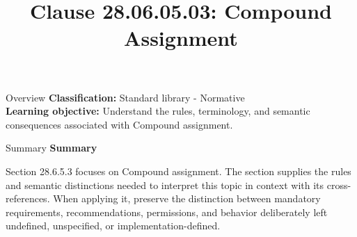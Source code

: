 \documentclass[10pt,letterpaper]{article}
\title{Clause 28.06.05.03: Compound Assignment}
\author{}
\date{}
\begin{document}
\maketitle
\begin{CornellOverviewBox}{Overview}
\textbf{Classification:} Standard library - Normative\\[2pt]
\textbf{Learning objective:} Understand the rules, terminology, and semantic consequences associated with Compound assignment.
\end{CornellOverviewBox}\begin{CornellSummaryBox}{Summary}
{\sffamily\bfseries\color{Accent} Summary}\par\vspace{3pt}Section 28.6.5.3 focuses on Compound assignment. The section supplies the rules and semantic distinctions needed to interpret this topic in context with its cross-references. When applying it, preserve the distinction between mandatory requirements, recommendations, permissions, and behavior deliberately left undefined, unspecified, or implementation-defined.
\end{CornellSummaryBox}
\end{document}

